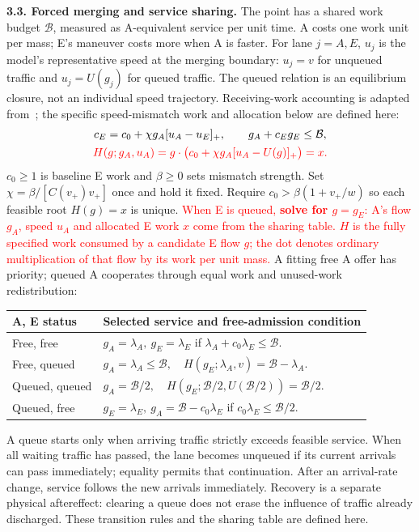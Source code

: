\documentclass[10pt,a4paper]{article}
\newcommand{\pos}[1]{[#1]_+}
\newcommand{\bud}{\mathcal B}
\newcommand{\rev}[1]{\textcolor{red}{#1}}
\begin{document}
\newpage
\textbf{3.3. Forced merging and service sharing.}
\begingroup\color{red}
The point has a shared work budget $\bud$, measured as A-equivalent service
per unit time. A costs one work unit per mass; E's maneuver costs more
when A is faster. For lane $j=A,E$, $u_j$ is the model's representative
speed at the merging boundary: $u_j=v$ for unqueued traffic and
$u_j=U(g_j)$ for queued traffic. The queued relation is an equilibrium
closure, not an individual speed trajectory.
Receiving-work accounting is adapted from~\cite{carey}; the specific
speed-mismatch work and allocation below are defined here:
\endgroup
\begin{equation}
 \begin{gathered}
 c_E=c_0+\chi g_A\pos{u_A-u_E},\qquad
 g_A+c_Eg_E\leq\bud,\\
 \rev{H(g;g_A,u_A)=g\cdot\bigl(c_0+\chi g_A\pos{u_A-U(g)}\bigr)=x.}
 \end{gathered}
 \label{eq:work}
\end{equation}
$c_0\geq1$ is baseline E work and $\beta\geq0$ sets mismatch strength.
Set $\chi=\beta/[C(v_+)v_+]$ once and hold it fixed.
Require $c_0>\beta(1+v_+/w)$ so each feasible root $H(g)=x$
is unique.
\rev{When E is queued, \textbf{solve for $g=g_E$}: A's flow $g_A$, speed
$u_A$ and allocated E work $x$ come from the sharing table. $H$ is the fully
specified work consumed by a candidate E flow $g$; the dot denotes ordinary
multiplication of that flow by its work per unit mass.}
A fitting free A offer has
priority; queued A cooperates through equal work and unused-work redistribution:
\begin{center}
\setlength{\tabcolsep}{5pt}
\begin{tabular}{@{}ll@{}}
\toprule
A, E status & Selected service and free-admission condition\\
\midrule
Free, free & $g_A=\lambda_A,\ g_E=\lambda_E$ if
$\lambda_A+c_0\lambda_E\leq\bud$.\\
Free, queued & $g_A=\lambda_A\leq\bud,\quad
H(g_E;\lambda_A,v)=\bud-\lambda_A$.\\
Queued, queued & $g_A=\bud/2,\quad
H(g_E;\bud/2,U(\bud/2))=\bud/2$.\\
Queued, free & $g_E=\lambda_E,\ g_A=\bud-c_0\lambda_E$ if
$c_0\lambda_E\leq\bud/2$.\\
\bottomrule
\end{tabular}
\end{center}
\begingroup\color{red}
A queue starts only when arriving traffic strictly exceeds feasible service.
When all waiting traffic has passed, the lane becomes unqueued if its
current arrivals can pass immediately; equality permits that continuation.
After an arrival-rate change, service follows the new arrivals immediately.
Recovery is a separate physical aftereffect: clearing a queue does not erase
the influence of traffic already discharged. These transition rules and
the sharing table are defined here.
\endgroup
\end{document}
